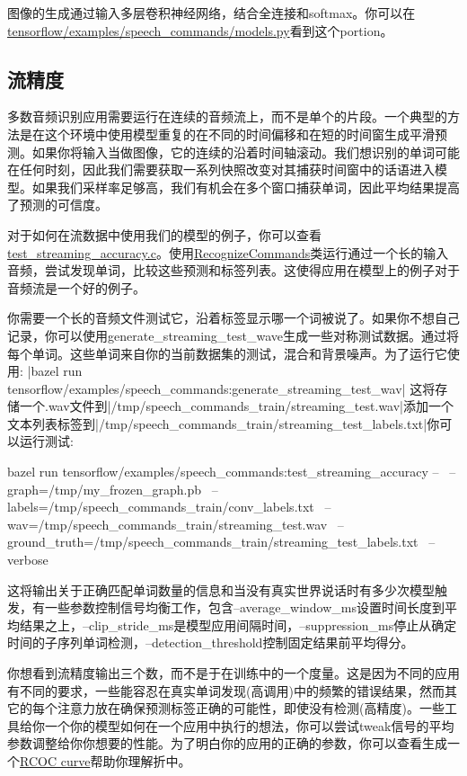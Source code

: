 图像的生成通过输入多层卷积神经网络，结合全连接和softmax。你可以在\href{https://github.com/tensorflow/tensorflow/tree/master/tensorflow/examples/speech_commands/models.py}{tensorflow/examples/speech\_commands/models.py}看到这个portion。
\subsection{流精度}
多数音频识别应用需要运行在连续的音频流上，而不是单个的片段。一个典型的方法是在这个环境中使用模型重复的在不同的时间偏移和在短的时间窗生成平滑预测。如果你将输入当做图像，它的连续的沿着时间轴滚动。我们想识别的单词可能在任何时刻，因此我们需要获取一系列快照改变对其捕获时间窗中的话语进入模型。如果我们采样率足够高，我们有机会在多个窗口捕获单词，因此平均结果提高了预测的可信度。

对于如何在流数据中使用我们的模型的例子，你可以查看\href{https://github.com/tensorflow/tensorflow/tree/master/tensorflow/examples/speech_commands/}{test\_streaming\_accuracy.c}。使用\href{https://github.com/tensorflow/tensorflow/tree/master/tensorflow/examples/speech_commands/recognize_commands.h}{RecognizeCommands}类运行通过一个长的输入音频，尝试发现单词，比较这些预测和标签列表。这使得应用在模型上的例子对于音频流是一个好的例子。

你需要一个长的音频文件测试它，沿着标签显示哪一个词被说了。如果你不想自己记录，你可以使用generate\_streaming\_test\_wave生成一些对称测试数据。通过将每个单词。这些单词来自你的当前数据集的测试，混合和背景噪声。为了运行它使用:\newline 
\bash|bazel run tensorflow/examples/speech_commands:generate_streaming_test_wav|
这将存储一个.wav文件到\text|/tmp/speech_commands_train/streaming_test.wav|添加一个文本列表标签到\text|/tmp/speech_commands_train/streaming_test_labels.txt|你可以运行测试:
\begin{bashcode}
bazel run tensorflow/examples/speech_commands:test_streaming_accuracy -- \
--graph=/tmp/my_frozen_graph.pb \
--labels=/tmp/speech_commands_train/conv_labels.txt \
--wav=/tmp/speech_commands_train/streaming_test.wav \
--ground_truth=/tmp/speech_commands_train/streaming_test_labels.txt \
--verbose
\end{bashcode}
这将输出关于正确匹配单词数量的信息和当没有真实世界说话时有多少次模型触发，有一些参数控制信号均衡工作，包含--average\_window\_ms设置时间长度到平均结果之上，--clip\_stride\_ms是模型应用间隔时间，--suppression\_ms停止从确定时间的子序列单词检测，--detection\_threshold控制固定结果前平均得分。

你想看到流精度输出三个数，而不是于在训练中的一个度量。这是因为不同的应用有不同的要求，一些能容忍在真实单词发现(高调用)中的频繁的错误结果，然而其它的每个注意力放在确保预测标签正确的可能性，即使没有检测(高精度)。一些工具给你一个你的模型如何在一个应用中执行的想法，你可以尝试tweak信号的平均参数调整给你你想要的性能。为了明白你的应用的正确的参数，你可以查看生成一个\href{https://en.wikipedia.org/wiki/Receiver_operating_characteristic}{RCOC curve}帮助你理解折中。
